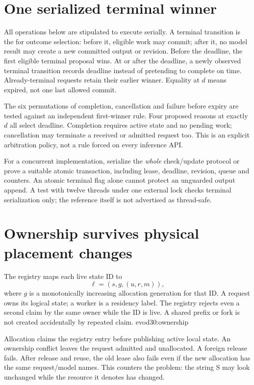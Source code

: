 \section{One serialized terminal winner}
All operations below are stipulated to execute serially.
A terminal transition is the  for outcome selection:
before it, eligible work may commit; after it, no model result may create a new
committed output or revision.
Before the deadline, the first eligible terminal proposal wins.
At or after the deadline, a newly observed terminal transition records deadline
instead of pretending to complete on time. Already-terminal requests retain their
earlier winner. Equality at $d$ means expired, not one last allowed commit.

The six permutations of completion, cancellation and failure before expiry are
tested against an independent first-winner rule. Four proposed reasons at exactly
$d$ all select deadline. Completion requires active state and no pending work;
cancellation may terminate a received or admitted request too.
This is an explicit arbitration policy, not a rule forced on every inference API.

For a concurrent implementation, serialize the \emph{whole} check/update protocol
or prove a suitable atomic transaction, including lease, deadline, revision,
queue and counters. An atomic terminal flag alone cannot protect an unguarded
output append. A test with twelve threads under one external lock checks terminal
serialization only; the reference itself is not advertised as thread-safe.

\section{Ownership survives physical placement changes}
The registry maps each live state ID to
\[
 \ell=(s,g,(u,r,m)),
\]
where $g$ is a monotonically increasing allocation generation for that ID.
A request owns its logical state; a worker is a residency label.
The registry rejects even a second claim by the same owner while the ID is live.
A shared prefix or fork is not created accidentally by repeated claim.
{evod30:ownership}

Allocation claims the registry entry before publishing active local state.
An ownership conflict leaves the request admitted and unallocated.
A foreign release fails. After release and reuse, the old lease also fails even
if the new allocation has the same request/model names.
This counters the  problem: the string S may look unchanged while
the resource it denotes has changed.


